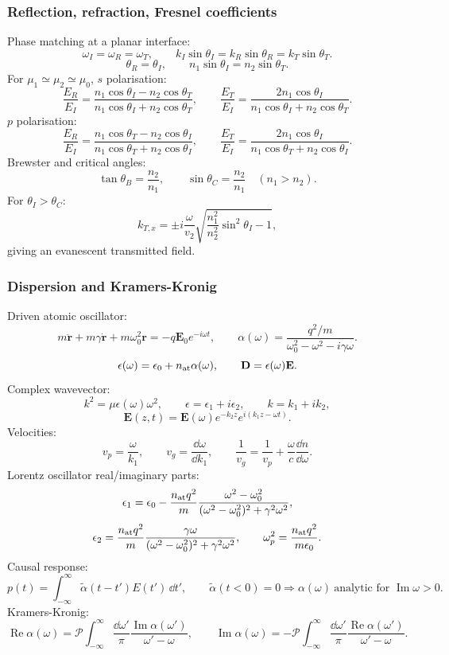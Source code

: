 \subsubsection*{Reflection, refraction, Fresnel coefficients}
Phase matching at a planar interface:
\[
\omega_I=\omega_R=\omega_T,\qquad
k_I\sin\theta_I=k_R\sin\theta_R=k_T\sin\theta_T.
\]
\[
\boxed{\theta_R=\theta_I},\qquad
\boxed{n_1\sin\theta_I=n_2\sin\theta_T}.
\]
For $\mu_1\simeq\mu_2\simeq\mu_0$, $s$ polarisation:
\[
\frac{E_R}{E_I}=\frac{n_1\cos\theta_I-n_2\cos\theta_T}
{n_1\cos\theta_I+n_2\cos\theta_T},\qquad
\frac{E_T}{E_I}=\frac{2n_1\cos\theta_I}
{n_1\cos\theta_I+n_2\cos\theta_T}.
\]
$p$ polarisation:
\[
\frac{E_R}{E_I}=\frac{n_1\cos\theta_T-n_2\cos\theta_I}
{n_1\cos\theta_T+n_2\cos\theta_I},\qquad
\frac{E_T}{E_I}=\frac{2n_1\cos\theta_I}
{n_1\cos\theta_T+n_2\cos\theta_I}.
\]
Brewster and critical angles:
\[
\boxed{\tan\theta_B=\frac{n_2}{n_1}},\qquad
\boxed{\sin\theta_C=\frac{n_2}{n_1}}\quad(n_1>n_2).
\]
For $\theta_I>\theta_C$:
\[
k_{T,x}=\pm i\frac{\omega}{v_2}
\sqrt{\frac{n_1^2}{n_2^2}\sin^2\theta_I-1},
\]
giving an evanescent transmitted field. 

\subsubsection*{Dispersion and Kramers-Kronig}
Driven atomic oscillator:
\[
m\ddot{\mathbf r}+m\gamma\dot{\mathbf r}+m\omega_0^2\mathbf r=-q\mathbf E_0e^{-i\omega t},
\qquad
\boxed{\alpha(\omega)=\frac{q^2/m}{\omega_0^2-\omega^2-i\gamma\omega}}.
\]
\[
\epsilon(\omega)=\epsilon_0+n_{\rm at}\alpha(\omega),\qquad
\mathbf D=\epsilon(\omega)\mathbf E.
\]
Complex wavevector:
\[
k^2=\mu\epsilon(\omega)\omega^2,\qquad
\epsilon=\epsilon_1+i\epsilon_2,\qquad k=k_1+ik_2,
\]
\[
\mathbf E(z,t)=\mathbf E(\omega)e^{-k_2z}e^{i(k_1z-\omega t)}.
\]
Velocities:
\[
v_p=\frac{\omega}{k_1},\qquad
v_g=\frac{\dd\omega}{\dd k_1},\qquad
\frac{1}{v_g}=\frac{1}{v_p}+\frac{\omega}{c}\frac{\dd n}{\dd\omega}.
\]
Lorentz oscillator real/imaginary parts:
\[
\epsilon_1=\epsilon_0-\frac{n_{\rm at}q^2}{m}
\frac{\omega^2-\omega_0^2}{(\omega^2-\omega_0^2)^2+\gamma^2\omega^2},
\]
\[
\epsilon_2=\frac{n_{\rm at}q^2}{m}
\frac{\gamma\omega}{(\omega^2-\omega_0^2)^2+\gamma^2\omega^2},\qquad
\omega_p^2=\frac{n_{\rm at}q^2}{m\epsilon_0}.
\]
Causal response:
\[
p(t)=\int_{-\infty}^{\infty}\tilde\alpha(t-t')E(t')\,\dd t',\qquad
\tilde\alpha(t<0)=0
\Longrightarrow \alpha(\omega)\ \text{analytic for }\operatorname{Im}\omega>0.
\]
Kramers-Kronig:
\[
\operatorname{Re}\alpha(\omega)=\mathcal P\int_{-\infty}^{\infty}\frac{\dd\omega'}{\pi}
\frac{\operatorname{Im}\alpha(\omega')}{\omega'-\omega},\qquad
\operatorname{Im}\alpha(\omega)=-\mathcal P\int_{-\infty}^{\infty}\frac{\dd\omega'}{\pi}
\frac{\operatorname{Re}\alpha(\omega')}{\omega'-\omega}.
\]

